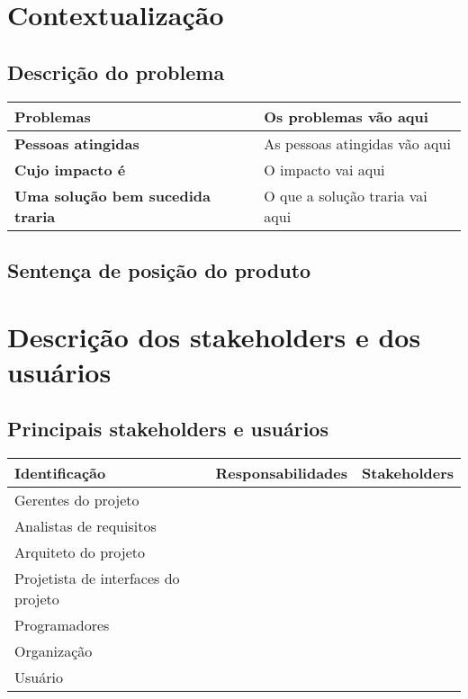 \documentclass[12pt, a4paper]{article}
\begin{document}
    \section{Contextualização}
        \subsection{Descrição do problema}
            \begin{tabular}{ p{4cm} | p{11cm} }
                \hline
                \textbf{Problemas} &
                Os problemas vão aqui \\ \hline
                \textbf{Pessoas atingidas} &
                As pessoas atingidas vão aqui \\ \hline
                \textbf{Cujo impacto é} &
                O impacto vai aqui \\ \hline
                \textbf{Uma solução bem sucedida traria} &
                O que a solução traria vai aqui \\ \hline
            \end{tabular}

    \subsection{Sentença de posição do produto}

    \section{Descrição dos stakeholders e dos usuários}
        \subsection{Principais stakeholders e usuários}
            \begin{tabular}{ p{5cm} | p{5cm} | p{5cm} }
                \hline
                \textbf{Identificação} &
                \textbf{Responsabilidades} &
                \textbf{Stakeholders} \\ \hline
                Gerentes do projeto & & \\ \hline
                Analistas de requisitos & & \\ \hline
                Arquiteto do projeto & & \\ \hline
                Projetista de interfaces do projeto & & \\ \hline
                Programadores & & \\ \hline
                Organização & & \\ \hline
                Usuário & & \\
            \end{tabular}
\end{document}
